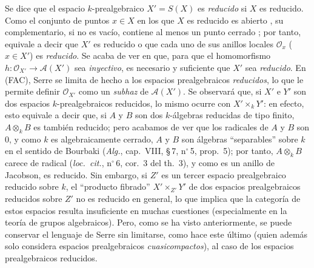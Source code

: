 \begin{env}[10.10.4]
\label{IV.10.10.4}
Se dice que el espacio $k$-prealgebraico $X'=S(X)$ es \emph{reducido} si $X$ es reducido. Como el conjunto de puntos $x\in X$ en los que $X$ es reducido es abierto , su complementario, si no es vacío, contiene al menos un punto cerrado ; por tanto, equivale a decir que $X'$ es reducido o que cada uno de sus anillos locales $\mathcal O_x$ ($x\in X'$) es \emph{reducido}. Se acaba de ver en  que, para que el homomorfismo $h:\mathcal O_{X'}\to\mathcal A(X')$ sea \emph{inyectivo}, es necesario y suficiente que $X'$ sea \emph{reducido}.
En (FAC), Serre se limita de hecho a los espacios prealgebraicos \emph{reducidos}, lo que le permite definir $\mathcal O_{X'}$ como un \emph{subhaz} de $\mathcal A(X')$.
Se observará que, si $X'$ e $Y'$ son dos espacios $k$-prealgebraicos reducidos, lo mismo ocurre con $X'\times_kY'$: en efecto, esto equivale a decir que, si $A$ y $B$ son dos $k$-álgebras reducidas de tipo finito, $A\otimes_kB$ es también reducido; pero acabamos de ver que los radicales de $A$ y $B$ son $0$, y como $k$ es algebraicamente cerrado, $A$ y $B$ son álgebras ``separables'' sobre $k$ en el sentido de Bourbaki (\emph{Alg.}, cap.~VIII, \S\,7, n$^\circ$\,5, prop.~5); por tanto, $A\otimes_kB$ carece de radical (\emph{loc.\ cit.}, n$^\circ$\,6, cor.~3 del th.~3), y como es un anillo de Jacobson, es reducido.
Sin embargo, si $Z'$ es un tercer espacio prealgebraico reducido sobre $k$, el ``producto fibrado'' $X'\times_{Z'}Y'$ de dos espacios prealgebraicos reducidos sobre $Z'$ no es reducido en general, lo que implica que la categoría de estos espacios resulta insuficiente en muchas cuestiones (especialmente en la teoría de grupos algebraicos).
Pero, como se ha visto anteriormente, se puede conservar el lenguaje de Serre sin limitarse, como hace este último (quien además solo considera espacios prealgebraicos \emph{cuasicompactos}), al caso de los espacios prealgebraicos reducidos.
\end{env}


